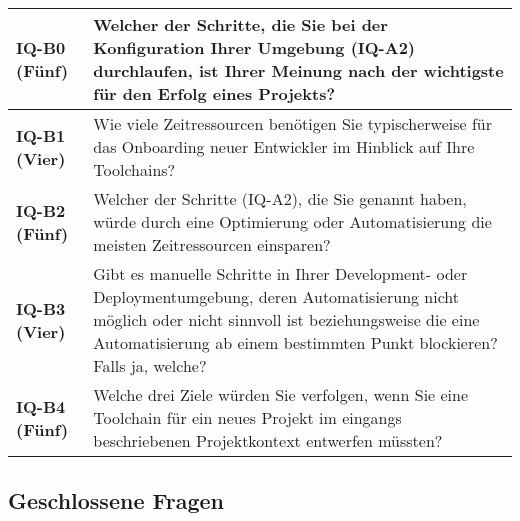 \begin{table}[H]
    \centering
    \begin{tabular}{ >{\raggedright\bfseries}p{} p{} }
        IQ-B0 (Fünf) &
        Welcher der Schritte, die Sie bei der Konfiguration Ihrer Umgebung (IQ-A2) durchlaufen, ist Ihrer Meinung nach der wichtigste für den Erfolg eines Projekts?  \\
        \hline
        IQ-B1 (Vier) &
        Wie viele Zeitressourcen benötigen Sie typischerweise für das Onboarding neuer Entwickler im Hinblick auf Ihre Toolchains? \newline
        [Ressourcen in h] \\
        \hline
        IQ-B2 (Fünf) &
        Welcher der Schritte (IQ-A2), die Sie genannt haben, würde durch eine Optimierung oder Automatisierung die meisten Zeitressourcen einsparen?  \\
        \hline
        IQ-B3 (Vier) &
        Gibt es manuelle Schritte in Ihrer Development- oder Deploymentumgebung, deren Automatisierung nicht möglich oder nicht sinnvoll ist beziehungsweise die eine Automatisierung ab einem bestimmten Punkt blockieren? Falls ja, welche?  \\
        \hline
        IQ-B4 (Fünf) &
        Welche drei Ziele würden Sie verfolgen, wenn Sie eine Toolchain für ein neues Projekt im eingangs beschriebenen Projektkontext entwerfen müssten?  \\
    \end{tabular}
\end{table}

\clearpage

\subsection{Geschlossene Fragen}
\label{subsec:AA-01-03_closed-questions}

